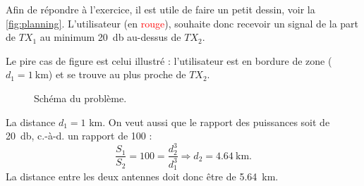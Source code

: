 \documentclass [a4paper, 11pt] {article}
\begin{document}
    \begin{reponse}
        Afin de répondre à l'exercice, il est utile de faire un petit dessin, voir la \autoref{fig:planning}. L'utilisateur (en \textcolor{red}{rouge}), souhaite donc recevoir un signal de la part de $TX_1$ au minimum \SI{20}{\decibel} au-dessus de $TX_2$.
        
        Le pire cas de figure est celui illustré : l'utilisateur est en bordure de zone ($d_1=\SI{1}{\kilo\meter}$) et se trouve au plus proche de $TX_2$.
        \begin{figure}[H]
            \centering
            \caption{Schéma du problème.}
            \label{fig:planning}
        \end{figure}
        
        La distance $d_1=1$ km. On veut aussi que le rapport des puissances soit de \SI{20}{\decibel}, c.-à-d. un rapport de 100 :
        \begin{equation}
            \frac{S_1}{S_2} = 100 = \frac{d_2^3}{d_1^3} \Rightarrow d_2 = \SI{4.64}{\kilo\meter}.
        \end{equation}
        La distance entre les deux antennes doit donc être de \SI{5.64}{\kilo\meter}.
        
    \end{reponse}
\end{document}
